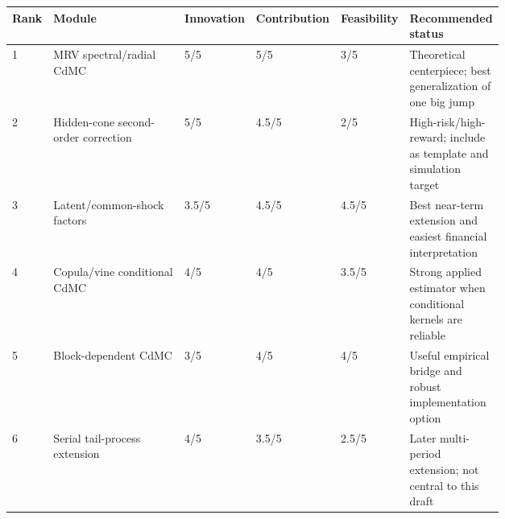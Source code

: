 \begin{tabularx}{\linewidth}{p{0.04\linewidth}p{0.27\linewidth}p{0.13\linewidth}p{0.14\linewidth}p{0.13\linewidth}X}
\toprule
Rank & Module & Innovation & Contribution & Feasibility & Recommended status \\
\midrule
1 & MRV spectral/radial CdMC & 5/5 & 5/5 & 3/5 & Theoretical centerpiece; best generalization of one big jump \\
2 & Hidden-cone second-order correction & 5/5 & 4.5/5 & 2/5 & High-risk/high-reward; include as template and simulation target \\
3 & Latent/common-shock factors & 3.5/5 & 4.5/5 & 4.5/5 & Best near-term extension and easiest financial interpretation \\
4 & Copula/vine conditional CdMC & 4/5 & 4/5 & 3.5/5 & Strong applied estimator when conditional kernels are reliable \\
5 & Block-dependent CdMC & 3/5 & 4/5 & 4/5 & Useful empirical bridge and robust implementation option \\
6 & Serial tail-process extension & 4/5 & 3.5/5 & 2.5/5 & Later multi-period extension; not central to this draft \\
\bottomrule
\end{tabularx}

